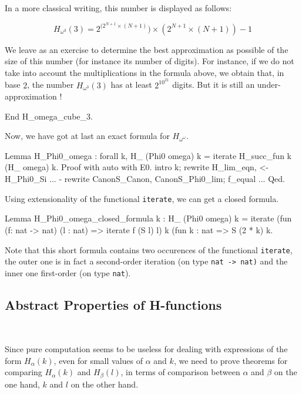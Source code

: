 In a more classical writing, this number is displayed as follows:

{\Large
$$
H_{\omega^3}(3) =  2 ^ {(2 ^ {N + 1} \times (N+1) } )  \times  (2 ^ {N+1} \times ( N +1) ) - 1
$$
}


We leave as an exercise to determine the best approximation as possible of
 the size of this number (for instance its number of digits).  For instance, if
we do not take into account the multiplications in the formula above,
we obtain that, in base $2$, the number $H_{\omega^3}(3)$ has at least
$2^{10^{21}}$  digits. But it is still an under-approximation !


\begin{Coqsrc}
End H_omega_cube_3.
\end{Coqsrc}




Now, we have got at last an exact formula for $H_{\omega^\omega}$.

\begin{Coqsrc}
Lemma H_Phi0_omega : forall k, H_ (Phi0 omega) k =
                               iterate H_succ_fun  k (H_ omega) k.
Proof with auto with E0.
  intro k; rewrite H_lim_eqn, <- H_Phi0_Si ...
  -  rewrite CanonS_Canon, CanonS_Phi0_lim;  f_equal ...
Qed.
\end{Coqsrc}

Using extensionality of the functional \texttt{iterate}, we can get a closed formula.

\begin{Coqsrc}
Lemma H_Phi0_omega_closed_formula k :
  H_ (Phi0 omega) k =
  iterate (fun (f: nat -> nat) (l : nat) => iterate  f (S l) l)
               k
               (fun k : nat => S (2 * k)%
               k.
\end{Coqsrc}




Note that this short formula contains two occurences of the functional \texttt{iterate}, the outer one is in fact a second-order iteration (on type \texttt{nat -> nat)}
and the inner one  first-order (on type \texttt{nat}). 


\subsection{Abstract Properties of H-functions}
~\label{sect:H-alpha-prop} 

Since pure computation seems to be useless for dealing with expressions of the form $H_\alpha(k)$, even for small values of $\alpha$ and $k$, we need to prove theorems for comparing $H_\alpha(k)$ and $H_\beta(l)$, in terms of comparison
between $\alpha$ and $\beta$ on the one hand, $k$ and $l$ on the other hand.

